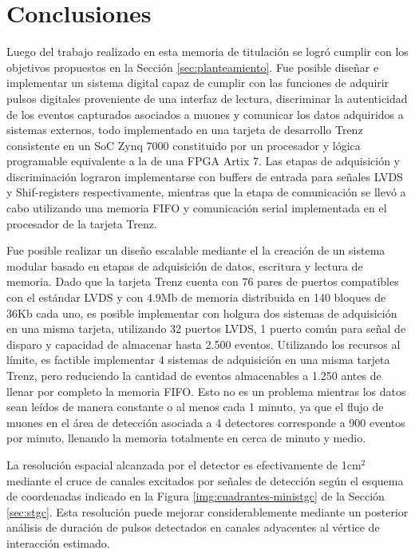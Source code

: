\section{Conclusiones}
\label{sec:conc}

Luego del trabajo realizado en esta memoria de titulación se logró cumplir con los objetivos propuestos en la Sección \ref{sec:planteamiento}. Fue posible diseñar e implementar un sistema digital capaz de cumplir con las funciones de adquirir pulsos digitales proveniente de una interfaz de lectura, discriminar la autenticidad de los eventos capturados asociados a muones y comunicar los datos adquiridos a sistemas externos, todo implementado en una tarjeta de desarrollo Trenz consistente en un SoC Zynq 7000 constituido por un procesador y lógica programable equivalente a la de una FPGA Artix 7. Las etapas de adquisición y discriminación lograron implementarse con buffers de entrada para señales LVDS y Shif-registers respectivamente, mientras que la etapa de comunicación se llevó a cabo utilizando una memoria FIFO y comunicación serial implementada en el procesador de la tarjeta Trenz.

Fue posible realizar un diseño escalable mediante el la creación de un sistema modular basado en etapas de adquisición de datos, escritura y lectura de memoria. Dado que la tarjeta Trenz cuenta con 76 pares de puertos compatibles con el estándar LVDS y con 4.9Mb de memoria distribuida en 140 bloques de 36Kb cada uno, es posible implementar con holgura dos sistemas de adquisición en una misma tarjeta, utilizando 32 puertos LVDS, 1 puerto común para señal de disparo y capacidad de almacenar hasta 2.500 eventos. Utilizando los recursos al límite, es factible implementar 4 sistemas de adquisición en una misma tarjeta Trenz, pero reduciendo la cantidad de eventos almacenables a 1.250 antes de llenar por completo la memoria FIFO. Esto no es un problema mientras los datos sean leídos de manera constante o al menos cada 1 minuto, ya que el flujo de muones en el área de detección asociada a 4 detectores corresponde a 900 eventos por minuto, llenando la memoria totalmente en cerca de minuto y medio.

La resolución espacial alcanzada por el detector es efectivamente de 1cm$^2$ mediante el cruce de canales excitados por señales de detección según el esquema de coordenadas indicado en la Figura \ref{img:cuadrantes-ministgc} de la Sección \ref{sec:stgc}. Esta resolución puede mejorar considerablemente mediante un posterior análisis de duración de pulsos detectados en canales adyacentes al vértice de interacción estimado. 

